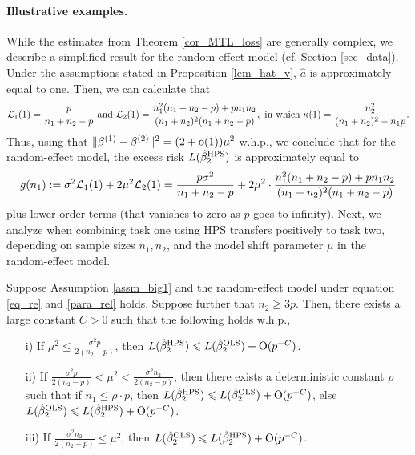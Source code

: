\paragraph{Illustrative examples.}
While the estimates from Theorem \ref{cor_MTL_loss} are generally complex, we describe a simplified result for the random-effect model (cf. Section \ref{sec_data}).
Under the assumptions stated in Proposition \ref{lem_hat_v}, $\hat{a}$ is approximately equal to one.
Then, we can calculate that
\[ \mathcal{L}_1(1) = \frac{p}{n_1 + n_2 - p} \text{ and } \mathcal{L}_2(1) = \frac{n_1^2(n_1 + n_2 - p) + p n_1 n_2}{(n_1 + n_2)^2 (n_1 + n_2 - p)}, \text{ in which } \kappa(1) = \frac{n_2^2}{(n_1 + n_2)^2 - n_1 p}. \]
Thus, using that $\|\beta^{(1)}-\beta^{(2)}\|^2 = (2+\operatorname{o}(1))\mu^2$ w.h.p., we conclude that for the random-effect model, the excess risk $L(\hat{\beta}_2^{\textup{HPS}})$ is approximately equal to
$$ g(n_1) := \sigma^2 \mathcal L_1(1) +   2\mu^2 \mathcal L_2(1)= \frac{p\sigma^2}{n_1+n_2-p} +  2\mu^2 \cdot \frac{n_1^2 (n_1+n_2-p)+p n_1n_2}{(n_1+n_2)^2(n_1+n_2-p)}$$
plus lower order terms (that vanishes to zero as $p$ goes to infinity).
Next, we analyze when combining task one using HPS transfers positively to task two, depending on sample sizes $n_1, n_2$, and the model shift parameter $\mu$ in the random-effect model.

\begin{claim}\label{claim_model_shift}
    Suppose Assumption \ref{assm_big1} and the random-effect model under equation \eqref{eq_re} and \eqref{para_rel} holds.
    Suppose further that $n_2 \ge 3p$.
    Then, there exists a large constant $C > 0$ such that the following holds w.h.p.,
    \begin{enumerate}
        \item[i)] If $\mu^2 \le \frac{\sigma^2 p}{2(n_2 - p)}$, then $L(\hat{\beta}_2^{\textup{HPS}}) \leqslant L(\hat{\beta}_2^{\textup{OLS}}) + \operatorname{O}(p^{-C})$.
        \item[ii)] If $\frac{\sigma^2 p}{2(n_2 - p)} < \mu^2 < \frac{\sigma^2 n_2}{2(n_2 - p)}$, then there exists a deterministic constant $\rho$ such that if $n_1 \le \rho\cdot p$, then $L(\hat{\beta}_2^{\textup{HPS}}) \leqslant L(\hat{\beta}_2^{\textup{OLS}}) + \operatorname{O}(p^{-C})$, else $L(\hat{\beta}_2^{\textup{OLS}}) \leqslant L(\hat{\beta}_2^{\textup{HPS}}) + \operatorname{O}(p^{-C})$.
        \item[iii)] If $\frac{\sigma^2 n_2} {2(n_2 - p)} \le \mu^2$, then $L(\hat{\beta}_2^{\textup{OLS}}) \leqslant L(\hat{\beta}_2^{\textup{HPS}}) + \operatorname{O}(p^{-C})$.
    \end{enumerate}
\end{claim}

